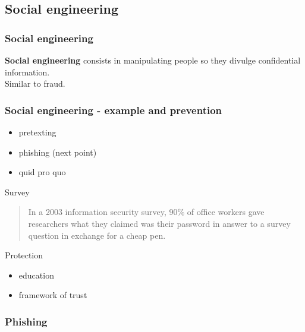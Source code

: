 \subsection{Social engineering}

\begin{frame}
\frametitle{Social engineering}
\textbf{Social engineering} consists in manipulating people so they divulge
confidential information.
\\ Similar to fraud.
\pause
{}
\end{frame}

\begin{frame}
\frametitle{Social engineering - example and prevention}
\begin{itemize}
\item pretexting
\item phishing \small{(next point)}
\item quid pro quo
\end{itemize}
\begin{exampleblock}{Survey}
\begin{quote}
In a 2003 information security survey, 90\% of office workers gave
researchers what they claimed was their password in answer to a survey
question in exchange for a cheap pen.
\end{quote}
\end{exampleblock}
\begin{block}{Protection}
\begin{itemize}
\item education
\item framework of trust
\end{itemize}
\end{block}
\end{frame}

\subsubsection{Phishing}

